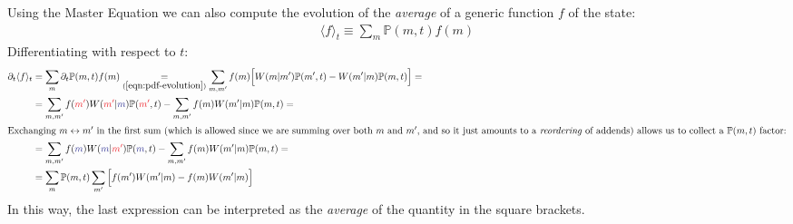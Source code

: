 \documentclass[../../main.tex]{subfiles}
\begin{document}
Using the Master Equation we can also compute the evolution of the \textit{average} of a generic function $f$ of the state:
\begin{align*}
    \langle f \rangle_t \equiv \sum_m \mathbb{P}(m,t) f(m)
\end{align*}
Differentiating with respect to $t$:
\begin{align} \nonumber
    \partial_t \langle f \rangle_t &= \sum_m \partial_t \mathbb{P}(m,t) f(m) \underset{(\ref{eqn:pdf-evolution})}{=}  \sum_{m,m'} f(m) \Big[ W(m|m')\mathbb{P}(m',t) - W(m'|m)\mathbb{P}(m,t)\Big] =\\ \nonumber
    &= \sum_{m,m'} f(\textcolor{Red}{m'}) W(\textcolor{Red}{m'}|\textcolor{Blue}{m}) \mathbb{P}(\textcolor{Red}{m'},t) - \sum_{m, m'} f(m) W(m'|m)\mathbb{P}(m,t) = \\ 
    \shortintertext{Exchanging $m \leftrightarrow m'$ in the first sum (which is allowed since we are summing over both $m$ and $m'$, and so it just amounts to a \textit{reordering} of addends) allows us to collect a $\mathbb{P}(m,t)$ factor:} \nonumber
    &= \sum_{m,m'} f(\textcolor{Blue}{m}) W(\textcolor{Blue}{m}|\textcolor{Red}{m'}) \mathbb{P}(\textcolor{Blue}{m},t) - \sum_{m,m'} f(m) W(m'|m) \mathbb{P}(m,t) =\\ \label{eqn:evolution-of-averages}
    &= \sum_m \mathbb{P}(m,t) \sum_{m'} \Big[f(m') W(m'|m) - f(m) W(m'|m) \Big]
\end{align}
In this way, the last expression can be interpreted as the \textit{average} of the quantity in the square brackets. 

\medskip
\end{document}
